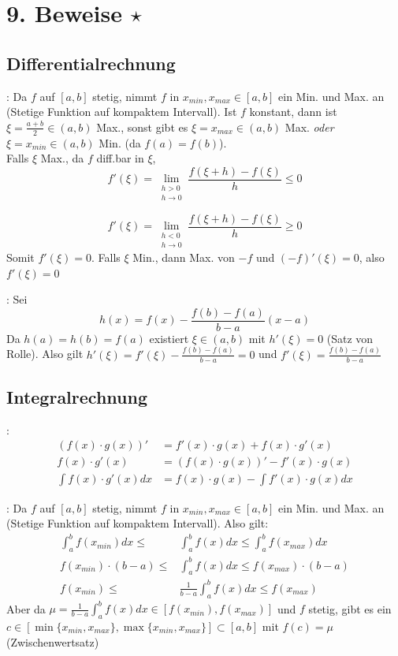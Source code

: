 \section{9. Beweise \texorpdfstring{$\star$}{*}}

\subsection{Differentialrechnung}

\Bew {}: Da $f$ auf $[a, b]$ stetig, nimmt $f$ in $x_{min}, x_{max} \in [a, b]$
ein Min. und Max. an (Stetige Funktion auf kompaktem Intervall).
Ist $f$ konstant, dann ist $\xi = \frac{a + b}{2} \in (a,b)$ Max.,
sonst gibt es $\xi = x_{max} \in (a, b)$ Max. \textit{oder} $\xi = x_{min} \in (a, b)$ Min. (da $f(a) = f(b)$). \\
Falls $\xi$ Max., da $f$ diff.bar in $\xi$,
$$f'(\xi) = \lim_{\substack{h > 0 \\ h \to 0}} \frac{f(\xi + h) - f(\xi)}{h} \le 0$$

$$f'(\xi) = \lim_{\substack{h < 0 \\ h \to 0}} \frac{f(\xi + h) - f(\xi)}{h} \ge 0$$
Somit $f'(\xi) = 0$. Falls $\xi$ Min., dann Max. von $-f$ und $(-f)'(\xi) = 0$, also $f'(\xi) = 0$

\Bew {}: Sei
$$h(x) = f(x) - \frac{f(b) - f(a)}{b - a} (x- a)$$
Da $h(a) = h(b) = f(a)$ existiert $\xi \in (a, b)$ mit $h'(\xi) = 0$ (Satz von Rolle).
Also gilt $h'(\xi) = f'(\xi) - \frac{f(b) - f(a)}{b - a} = 0$
und $f'(\xi) = \frac{f(b) - f(a)}{b - a}$

\subsection{Integralrechnung}

\Bew {}:
\begin{align*}
    (f(x) \cdot g(x))' &= f'(x)\cdot g(x) + f(x) \cdot g'(x) \\[-0.6em]
    f(x) \cdot g'(x) &= (f(x) \cdot g(x))' - f'(x) \cdot g(x) \\[-0.6em]
    \int f(x) \cdot g'(x) dx &= f(x) \cdot g(x) - \int f'(x) \cdot g(x) dx
\end{align*}

\Bew {}: Da $f$ auf $[a, b]$ stetig, nimmt $f$ in $x_{min}, x_{max} \in [a, b]$
ein Min. und Max. an (Stetige Funktion auf kompaktem Intervall). Also gilt:
\vspace{-0.2em}
\begin{align*}
    \int_a^b f(x_{min}) dx \le &\int_a^b f(x) dx \le \int_a^b f(x_{max}) dx \\[-0.2em]
    f(x_{min}) \cdot (b-a) \le &\int_a^b f(x) dx \le f(x_{max}) \cdot (b-a) \\[-0.2em]
    f(x_{min}) \le &\frac{1}{b-a}\int_a^b f(x) dx \le f(x_{max})
\end{align*}
Aber da $\mu = \displaystyle\frac{1}{b-a}\int_a^b f(x) dx \in [f(x_{min}), f(x_{max})]$ und $f$ stetig,
gibt es ein $c \in [\min\{x_{min}, x_{max}\}, \max\{x_{min}, x_{max}\}] \subset [a, b]$ mit $f(c) = \mu$ (Zwischenwertsatz)

